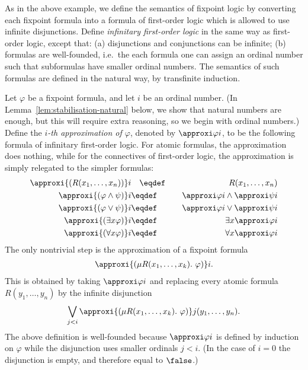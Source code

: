 As in the above example, we define the semantics of fixpoint logic by converting each fixpoint formula into a formula of first-order logic which is allowed to use infinite disjunctions. Define \emph{infinitary first-order logic} in the same way as first-order logic, except that: (a) disjunctions and conjunctions can be infinite; (b) formulas are well-founded, i.e.~the each formula one can assign an ordinal number such that subformulas have smaller ordinal numbers. The semantics of such formulas are defined in the natural way, by transfinite induction. 


Let $\varphi$ be a fixpoint formula, and let $i$ be an ordinal number. (In Lemma~\ref{lem:stabilisation-natural} below, we show that natural numbers are enough, but this will require extra reasoning, so we begin with ordinal numbers.) Define the \emph{$i$-th approximation of $\varphi$}, denoted by $\approxi \varphi i$, to be the following formula of infinitary first-order logic. For atomic formulas, the approximation does nothing, while for the connectives of first-order logic, the approximation is simply relegated to the simpler formulas:
\begin{eqnarray*}
 \approxi{(R(x_1,\ldots,x_n))}i &\quad \eqdef \quad& R(x_1,\ldots,x_n) \\ 
 \approxi{(\varphi \land \psi)} i &\eqdef& \approxi \varphi i \land \approxi \psi i \\ \approxi{(\varphi \lor \psi)} i &\eqdef& \approxi \varphi i \lor \approxi \psi i \\
 \approxi {(\exists x \varphi)} i &\eqdef& \exists x \approxi \varphi i \\ \approxi {(\forall x \varphi)} i &\eqdef& \forall x \approxi \varphi i
\end{eqnarray*}
The only nontrivial step is the approximation of a fixpoint formula
\begin{align*}
 \approxi {(\mu R(x_1,\ldots,x_k).\ \varphi)} i.
\end{align*}
This is obtained by taking $\approxi \varphi i$ and replacing every atomic formula $R(y_1,\ldots,y_n)$ by the infinite disjunction 
\begin{align*}
 \bigvee_{j < i} \approxi {(\mu R(x_1,\ldots,x_k).\ \varphi)} j (y_1,\ldots,y_n).
\end{align*}
The above definition is well-founded because $\approxi \varphi i$ is defined by induction on $\varphi$ while the disjunction uses smaller ordinals $j < i$. 
(In the case of $i=0$ the disjunction is empty, and therefore equal to $\false$.) 

